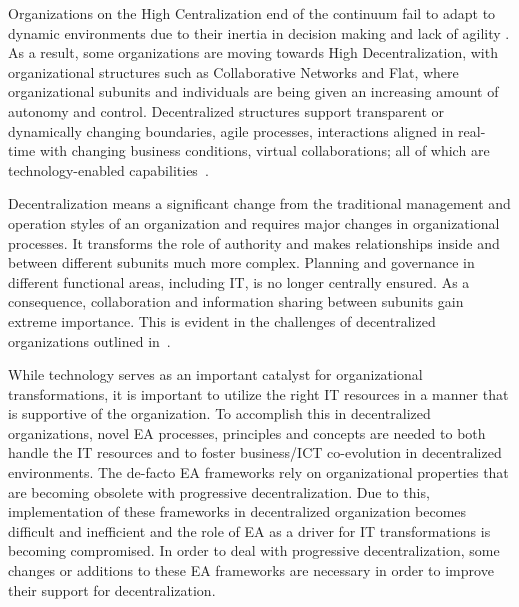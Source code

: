 Organizations on the High Centralization end of the continuum fail to adapt to dynamic environments due to their inertia in decision making and lack of agility \cite{fulk1995,pearlson2009}. As a result, some organizations are moving towards High Decentralization, with organizational structures such as Collaborative Networks \cite{Camarinha-Matos2005} and Flat, where organizational subunits and individuals are being given an increasing amount of autonomy and control. Decentralized structures support transparent or dynamically changing boundaries, agile processes, interactions aligned in real-time with changing business conditions, virtual collaborations; all of which are technology-enabled capabilities~\cite{applegate1988,fulk1995}.

Decentralization means a significant change from the traditional management and operation styles of an organization and requires major changes in organizational processes. It transforms the role of authority and makes relationships inside and between different subunits much more complex. Planning and governance in different functional areas, including IT, is no longer centrally ensured. As a consequence, collaboration and information sharing between subunits gain extreme importance. This is evident in the challenges of decentralized organizations outlined in~\cite{caruso2008boundaries}.  

While technology serves as an important catalyst for organizational transformations, it is important to utilize the right IT resources in a manner that is supportive of the organization. To accomplish this in decentralized organizations, novel EA processes, principles and concepts are needed to both handle the IT resources and to foster business/ICT co-evolution in decentralized environments. The de-facto EA frameworks rely on organizational properties that are becoming obsolete with progressive decentralization.  Due to this, implementation of these frameworks in decentralized organization becomes difficult and inefficient and the role of EA as a driver for IT transformations is becoming compromised. In order to deal with progressive decentralization, some changes or additions to these EA frameworks are necessary in order to improve their support for decentralization.




